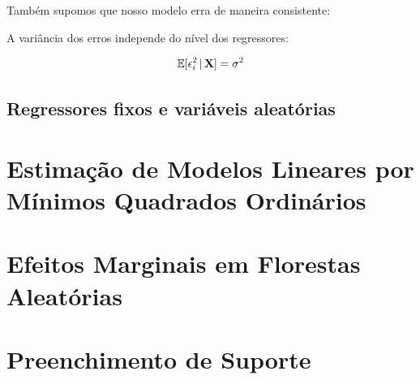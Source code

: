 Também supomos que nosso modelo erra de maneira consistente:

\begin{hipotese}[Homocedasticidade]
A variância dos erros independe do nível dos regressores:

\begin{align}
    \mathbb{E}[\epsilon_i^2\, |\, \mathbf{X} ] = \sigma^2
\end{align}


\end{hipotese}


\subsection{Regressores fixos e variáveis aleatórias}

\section{Estimação de Modelos Lineares por Mínimos Quadrados Ordinários}



\section{Efeitos Marginais em Florestas Aleatórias}






\section{Preenchimento de Suporte}